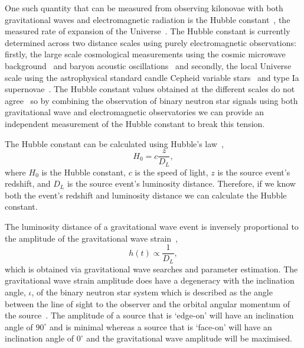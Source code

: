 One such quantity that can be measured from observing kilonovae with both gravitational waves and electromagnetic radiation is the Hubble constant~\cite{Schutz:1986}, the measured rate of expansion of the Universe~\cite{hubble:1929}. The Hubble constant is currently determined across two distance scales using purely electromagnetic observations: firstly, the large scale cosmological measurements using the cosmic microwave background~\cite{WMAP_H0:2003} and baryon acoustic oscillations~\cite{BAO_H0:2009} and secondly, the local Universe scale using the astrophysical standard candle Cepheid variable stars~\cite{Cepheids_H0:2001} and type Ia supernovae~\cite{TypeIa_H0:1998}. The Hubble constant values obtained at the different scales do not agree~\cite{H0_tension:2020} so by combining the observation of binary neutron star signals using both gravitational wave and electromagnetic observatories we can provide an independent measurement of the Hubble constant to break this tension.

The Hubble constant can be calculated using Hubble's law~\cite{hubble:1929},
%
\begin{equation}
    H_{0} = c \frac{z}{D_{L}}, 
    \label{6:eq:hubbles-law}
\end{equation}
%
where $H_{0}$ is the Hubble constant, $c$ is the speed of light, $z$ is the source event's redshift, and $D_{L}$ is the source event's luminosity distance. Therefore, if we know both the event's redshift and luminosity distance we can calculate the Hubble constant.

The luminosity distance of a gravitational wave event is inversely proportional to the amplitude of the gravitational wave strain~\cite{Schutz:1986},%
\begin{equation}
    h(t) \propto \frac{1}{D_{L}} , 
\end{equation}
%
which is obtained via gravitational wave searches and parameter estimation. The gravitational wave strain amplitude does have a degeneracy with the inclination angle, $\iota$, of the binary neutron star system which is described as the angle between the line of sight to the observer and the orbital angular momentum of the source~\cite{inclin_degen_2:2019}. The amplitude of a source that is `edge-on' will have an inclination angle of $90^{\circ}$ and is minimal whereas a source that is `face-on' will have an inclination angle of $0^{\circ}$ and the gravitational wave amplitude will be maximised.

